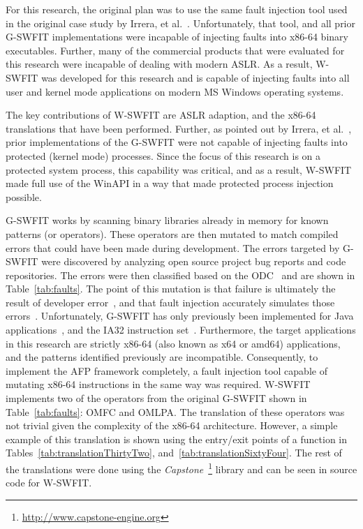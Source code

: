 For this research, the original plan was to use the same fault injection tool
used in the original case study by Irrera, et al.~\cite{irrera2015}.
Unfortunately, that tool, and all prior \ac{G-SWFIT} implementations were
incapable of injecting faults into x86-64 binary executables.  Further, many of
the commercial products that were evaluated for this research were incapable of
dealing with modern \ac{ASLR}.  As a result, \ac{W-SWFIT} was developed for
this research and is capable of injecting faults into all user and kernel mode
applications on modern \ac{MS} Windows operating systems.  

The key contributions of \ac{W-SWFIT} are \ac{ASLR} adaption, and the x86-64
translations that have been performed.  Further, as pointed out by Irrera, et
al.~\cite{irrera2013a}, prior implementations of the \ac{G-SWFIT} were not
capable of injecting faults into protected (kernel mode) processes.  Since the
focus of this research is on a protected system process, this capability was
critical, and as a result, \ac{W-SWFIT} made full use of the WinAPI in a way
that made protected process injection possible.  

\ac{G-SWFIT} works by scanning binary libraries already in memory for known
patterns (or operators).  These operators are then mutated to match compiled
errors that could have been made during development.  The errors targeted by
\ac{G-SWFIT} were discovered by analyzing open source project bug reports and
code repositories.  The errors were then classified based on the
\ac{ODC}~\cite{bridge1998} and are shown in Table~\ref{tab:faults}.  The point
of this mutation is that failure is ultimately the result of developer
error~\cite{irrera2015,salfnerSurvey}, and that fault injection accurately
simulates those errors~\cite{gswfit}.  Unfortunately, \ac{G-SWFIT} has only
previously been implemented for Java
applications~\cite{martins2002jaca,sanches2011jswfit}, and the IA32 instruction
set~\cite{gswfit,natella2010}.  Furthermore, the target applications in this
research are strictly x86-64 (also known as x64 or amd64) applications, and the
patterns identified previously are incompatible.  Consequently, to implement
the \ac{AFP} framework completely, a fault injection tool capable of mutating
x86-64 instructions in the same way was required.  \ac{W-SWFIT} implements two
of the operators from the original \ac{G-SWFIT} shown in
Table~\ref{tab:faults}: OMFC and OMLPA.  The translation of these operators was
not trivial given the complexity of the x86-64 architecture.  However, a simple
example of this translation is shown using the entry/exit points of a function
in Tables~\ref{tab:translationThirtyTwo}, and~\ref{tab:translationSixtyFour}.
The rest of the translations were done using the
\emph{Capstone}~\footnote{\url{http://www.capstone-engine.org}} library and can
be seen in source code for \ac{W-SWFIT}.

